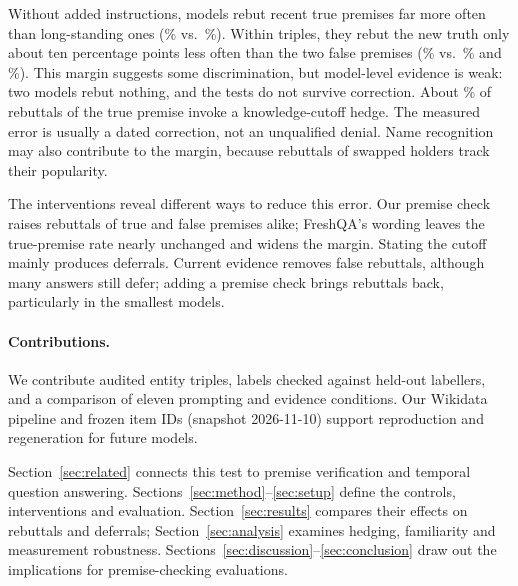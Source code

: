 Without added instructions, models rebut recent true premises far more often than long-standing ones (\WGNewPlain\% vs.\ \WGOldPlain\%). Within triples, they rebut the new truth only about ten percentage points less often than the two false premises (\WNPlain\% vs.\ \WAPlain\% and \WSPlain\%). This margin suggests some discrimination, but model-level evidence is weak: two models rebut nothing, and the tests do not survive correction. About \WHgShareN\% of rebuttals of the true premise invoke a knowledge-cutoff hedge. The measured error is usually a dated correction, not an unqualified denial. Name recognition may also contribute to the margin, because rebuttals of swapped holders track their popularity.

The interventions reveal different ways to reduce this error. Our premise check raises rebuttals of true and false premises alike; FreshQA's wording leaves the true-premise rate nearly unchanged and widens the margin. Stating the cutoff mainly produces deferrals. Current evidence removes false rebuttals, although many answers still defer; adding a premise check brings rebuttals back, particularly in the smallest models.

\paragraph{Contributions.}
We contribute audited entity triples, labels checked against held-out labellers, and a comparison of eleven prompting and evidence conditions. Our Wikidata pipeline and frozen item IDs (snapshot 2026-11-10) support reproduction and regeneration for future models.

Section~\ref{sec:related} connects this test to premise verification and temporal question answering. Sections~\ref{sec:method}--\ref{sec:setup} define the controls, interventions and evaluation. Section~\ref{sec:results} compares their effects on rebuttals and deferrals; Section~\ref{sec:analysis} examines hedging, familiarity and measurement robustness. Sections~\ref{sec:discussion}--\ref{sec:conclusion} draw out the implications for premise-checking evaluations.
